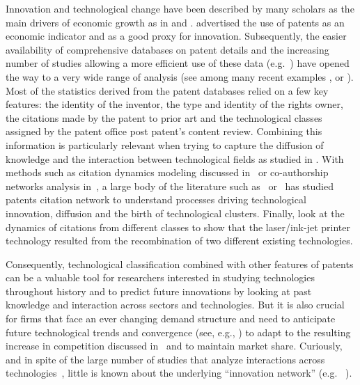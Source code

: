 \documentclass[article]{article}%
\begin{document}
Innovation and technological change have been described by many scholars as the main drivers of economic growth as in \citet{aghionhowitt1992} and \citet{romer1990}. \citet{RePEc:nbr:nberwo:3301} advertised the use of patents as an economic indicator and as a good proxy for innovation. Subsequently, the easier availability of comprehensive databases on patent details and the increasing number of studies allowing a more efficient use of these data (e.g.~\citealt{Hall2001}) have opened the way to a very wide range of analysis (see among many recent examples \citealt{bloom2013}, \citealt{aghion2018a} or \citealt{aghion2018b}). Most of the statistics derived from the patent databases relied on a few key features: the identity of the inventor, the type and identity of the rights owner, the citations made by the patent to prior art and the technological classes assigned by the patent office post patent's content review. Combining this information is particularly relevant when trying to capture the diffusion of knowledge and the interaction between technological fields as studied in \citet{Youn:2015fk}. With methods such as citation dynamics modeling discussed in~\citet{2013arXiv1310.8220N} or co-authorship networks analysis in~\citet{2014arXiv1402.7268S}, a large body of the literature such as~\citet{sorenson2006complexity} or~\citet{kay2014patent} has studied patents citation network to understand processes driving technological innovation, diffusion and the birth of technological clusters. Finally, \citet{bruck2016recognition} look at the dynamics of citations from different classes to show that the laser/ink-jet printer technology resulted from the recombination of two different existing technologies. 

Consequently, technological classification combined with other features of patents can be a valuable tool for researchers interested in studying technologies throughout history and to predict future innovations by looking at past knowledge and interaction across sectors and technologies. But it is also crucial for firms that face an ever changing demand structure and need to anticipate future technological trends and convergence (see, e.g., \citealt{curran2011patent}) to adapt to the resulting increase in competition discussed in~\cite{Katz1996remarks} and to maintain market share. Curiously, and in spite of the large number of studies that analyze interactions across technologies~\citet{Furman2011shoulders}, little is known about the underlying ``innovation network'' (e.g. ~\citealt{AAKnetwork2016}). 
\end{document}

